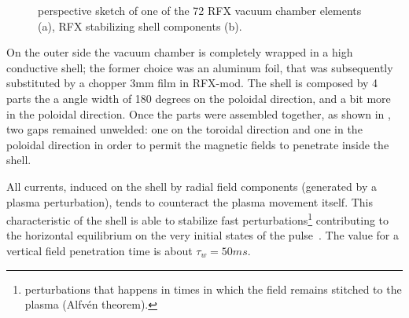 \begin{figure}[ht!]
\centering
{}
\caption{ perspective sketch of one of the 72 RFX vacuum chamber elements (a), RFX stabilizing shell components (b). }
\end{figure}
On the outer side the vacuum chamber is completely wrapped in a high conductive shell; the former choice was an aluminum foil, that was subsequently substituted by a chopper 3mm film in RFX-mod. The shell is composed by 4 parts the a angle width of 180 degrees on the poloidal direction, and a bit more in the poloidal direction. Once the parts were assembled together, as shown in \Figure{\ref{fig:rfx_shell}}, two gaps remained unwelded: one on the toroidal direction and one in the poloidal direction in order to permit the magnetic fields to penetrate inside the shell\cite{th13}.

All currents, induced on the shell by radial field components (generated by a plasma perturbation), tends to counteract the plasma movement itself. This characteristic of the shell is able to stabilize fast perturbations\footnote{perturbations that happens in times in which the field remains stitched to the plasma (Alfv\'en theorem).} contributing to the horizontal equilibrium on the very initial states of the pulse~\cite{th19}. The value for a vertical field penetration time is about $\tau_w = 50 ms$\cite{th12}.


